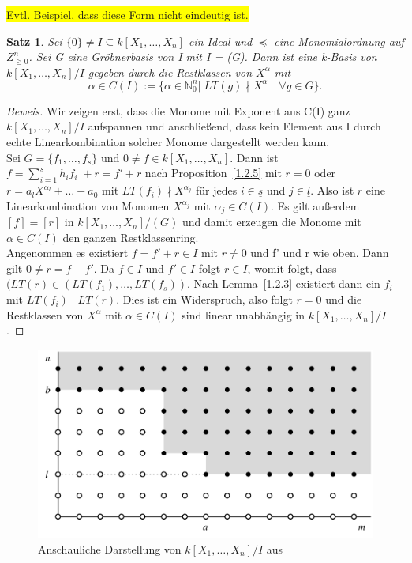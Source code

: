 \documentclass{article}
\newtheorem{satz}{Satz}
\newcommand*{\R}{k[X_{1},\ldots,X_{n}]}
\begin{document}
	
	\colorbox{yellow}{Evtl. Beispiel, dass diese Form nicht eindeutig ist.}


	\begin{satz} \label{1.2.8}
	Sei \(\{0\} \neq I \subseteq \R\) ein Ideal und \(\preceq\) eine Monomialordnung auf
	\(Z^{n}_{\geq 0}\). Sei G eine Gröbnerbasis von I mit I = (G). Dann ist eine k-Basis von 
	\(\R/I\) gegeben durch die Restklassen von \(X^{\alpha}\) mit
	\begin{displaymath}
	\alpha \in C(I) := \{\alpha \in \mathbb{N}^{n}_{0} |\; LT(g) \nmid X^{\alpha}\quad \forall g 
	\in G\}.
	\end{displaymath}
	\end{satz}

	\begin{proof}[Beweis]
	Wir zeigen erst, dass die Monome mit Exponent aus C(I) ganz \(k[X_{1},\ldots,X_{n}]/I\) 
	aufspannen und anschließend, dass kein Element aus I durch echte Linearkombination solcher
	Monome dargestellt werden kann. \\
	Sei \(G = \{f_{1}, \ldots, f_{s}\}\) und \(0 \neq f \in \R\). Dann ist
	\(f = \sum_{i=1}^{s} h_{i}f_{i}\; + r = f' + r\) nach Proposition~\ref{1.2.5} mit \(r=0\) oder 
	\(r = a_{l}X^{\alpha_{l}} + \ldots + a_{0}\) mit \(LT(f_{i}) \nmid X^{\alpha_{j}}\) 
	für jedes \(i \in \underline{s}\) und \(j \in \underline{l}\). Also ist \(r\) eine
	Linearkombination von Monomen \(X^{\alpha_{j}}\) mit \(\alpha_{j} \in C(I)\).
	Es gilt außerdem \([f] = [r]\) in \(\R/(G)\) und damit erzeugen die
	Monome mit \(\alpha \in C(I)\) den ganzen Restklassenring. \\
	Angenommen es existiert \(f = f' + r \in I\) mit \(r \neq 0\) und f' und r wie oben.
	Dann gilt \(0 \neq r = f - f'\). Da \(f \in I\) und \(f' \in I\) folgt
	\(r \in I\), womit folgt, dass \((LT(r) \in (LT(f_{1}), \ldots, LT(f_{s}))\).
	Nach Lemma~\ref{1.2.3} existiert dann ein \(f_{i}\) mit \(LT(f_{i})\; |\; LT(r)\). Dies ist 
	ein Widerspruch, also folgt \(r = 0\) und die Restklassen von \(X^{\alpha}\) mit
	\(\alpha \in C(I)\) sind linear unabhängig in \(\R/I\).
	\end{proof}
	

	\begin{figure}[h]
		\centering
		\includegraphics[width=.75\linewidth]{Dots.png}
		\caption{Anschauliche Darstellung von \(\R/I\) aus \cite{CLOS}}
		\label{dots}
	\end{figure}
	
\end{document}

